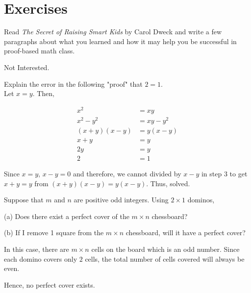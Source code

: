 \section*{Exercises}

\begin{problem}
  Read \emph{The Secret of Raising Smart Kids} by Carol Dweck and write a few paragraphs about what you learned and how it may help you be successful in proof-based math class.
\end{problem}

\begin{solution}
Not Interested.
\end{solution}


\begin{problem}
  Explain the error in the following "proof" that $2 = 1$. \\
  Let $x = y$. Then,

\begin{align}
x^2 &= xy \\
x^2 - y^2 &= xy - y^2 \\
(x+y)(x-y) &= y(x-y) \\
x+y &= y \\
2y &= y \\
2 &= 1
\end{align}
\end{problem}

\begin{solution}
  Since $x = y$, $x-y = 0$ and therefore, we cannot divided by $x-y$ in step $3$ to get $x+y = y$ from $(x+y)(x-y) = y(x-y)$. Thus, solved.
\end{solution}


\begin{problem}
  Suppose that $m$ and $n$ are positive odd integers. Using $2 \times 1$ dominos,

  (a) Does there exist a perfect cover of the $m \times n$ chessboard?

  (b) If I remove 1 square from the $m \times n$ chessboard, will it have a perfect cover?
\end{problem}

\begin{solution}[a]
  In this case, there are $m \times n$ cells on the board which is an odd number. Since each domino covers only $2$ cells, the total number of cells covered will always be even.

  Hence, no perfect cover exists.
\end{solution}


